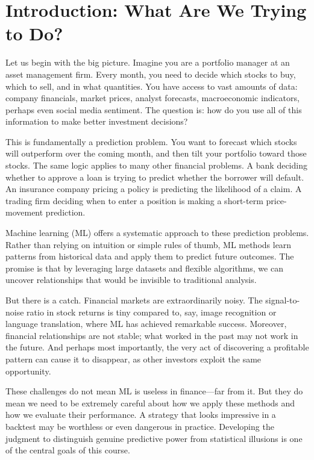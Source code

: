 \documentclass[11pt,a4paper]{article}
\begin{document}
\section{Introduction: What Are We Trying to Do?}

Let us begin with the big picture. Imagine you are a portfolio manager at an asset management firm. Every month, you need to decide which stocks to buy, which to sell, and in what quantities. You have access to vast amounts of data: company financials, market prices, analyst forecasts, macroeconomic indicators, perhaps even social media sentiment. The question is: how do you use all of this information to make better investment decisions?

This is fundamentally a prediction problem. You want to forecast which stocks will outperform over the coming month, and then tilt your portfolio toward those stocks. The same logic applies to many other financial problems. A bank deciding whether to approve a loan is trying to predict whether the borrower will default. An insurance company pricing a policy is predicting the likelihood of a claim. A trading firm deciding when to enter a position is making a short-term price-movement prediction.

Machine learning (ML) offers a systematic approach to these prediction problems. Rather than relying on intuition or simple rules of thumb, ML methods learn patterns from historical data and apply them to predict future outcomes. The promise is that by leveraging large datasets and flexible algorithms, we can uncover relationships that would be invisible to traditional analysis.

But there is a catch. Financial markets are extraordinarily noisy. The signal-to-noise ratio in stock returns is tiny compared to, say, image recognition or language translation, where ML has achieved remarkable success. Moreover, financial relationships are not stable; what worked in the past may not work in the future. And perhaps most importantly, the very act of discovering a profitable pattern can cause it to disappear, as other investors exploit the same opportunity.

These challenges do not mean ML is useless in finance---far from it. But they do mean we need to be extremely careful about how we apply these methods and how we evaluate their performance. A strategy that looks impressive in a backtest may be worthless or even dangerous in practice. Developing the judgment to distinguish genuine predictive power from statistical illusions is one of the central goals of this course.
\end{document}
